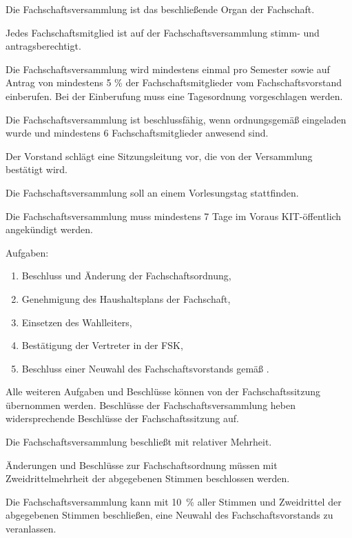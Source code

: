 \documentclass[a4paper, parskip=half, numbers=noenddot]{scrartcl}
\begin{document}
\begin{contract}
%
%

%
\label{fachschaft:vv}

Die Fachschaftsversammlung ist das beschließende Organ der Fachschaft.

Jedes Fachschaftsmitglied ist auf der Fachschaftsversammlung stimm- und antragsberechtigt.

Die Fachschaftsversammlung wird mindestens einmal pro Semester sowie auf Antrag von mindestens 5 \% der Fachschaftsmitglieder vom Fachschaftsvorstand einberufen. Bei der Einberufung muss eine Tagesordnung vorgeschlagen werden.

Die Fachschaftsversammlung ist beschlussfähig, wenn ordnungsgemäß eingeladen wurde und mindestens 6 Fachschaftsmitglieder anwesend sind.

Der Vorstand schlägt eine Sitzungsleitung vor, die von der Versammlung bestätigt wird.

Die Fachschaftsversammlung soll an einem Vorlesungstag stattfinden.

Die Fachschaftsversammlung muss mindestens 7 Tage im Voraus KIT-\"offentlich angekündigt werden.

Aufgaben: \label{fachschaft:vv:kompetenzen}
  \begin{enumerate}
  \item Beschluss und Änderung der Fachschaftsordnung,
  \item Genehmigung des Haushaltsplans der Fachschaft,
  \item Einsetzen des Wahlleiters, \label{fachschaft:vv:wahlleiter}
  \item Bestätigung der Vertreter in der FSK,
  \item Beschluss einer Neuwahl des Fachschaftsvorstands gemäß . \label{fachschaft:vv:kompetenzen:abwahl}
  \end{enumerate}

Alle weiteren Aufgaben und Beschlüsse können von der Fachschaftssitzung übernommen werden. Beschlüsse der Fachschaftsversammlung heben widersprechende Beschlüsse der Fachschaftssitzung auf.

Die Fachschaftsversammlung beschließt mit relativer Mehrheit.

Änderungen und Beschlüsse zur Fachschaftsordnung müssen mit Zweidrittelmehrheit der abgegebenen Stimmen beschlossen werden.

Die Fachschaftsversammlung kann mit 10~\% aller Stimmen und Zweidrittel der abgegebenen Stimmen be\-schlie\-ßen, eine Neuwahl des Fach\-schaftsvor\-stands zu veranlassen\label{fachschaft:vv:wahl}.


\end{contract}
\end{document}
